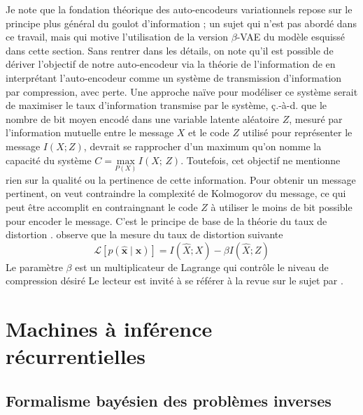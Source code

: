 Je note que la fondation théorique des auto-encodeurs variationnels repose sur le principe plus général 
du goulot d'information \citep{Tishby1999}; un sujet qui n'est pas abordé dans ce travail, mais qui motive 
l'utilisation de la version $\beta$-VAE du modèle esquissé dans cette section. Sans rentrer dans les détails, on note 
qu'il est possible de dériver l'objectif de notre auto-encodeur via la théorie de l'information de \citet{Shannon1948} en interprétant 
l'auto-encodeur comme un système de transmission d'information par compression, avec perte. 
Une approche naïve pour modéliser ce système serait de maximiser le taux d'information transmise par le système, 
ç.-à-d. que le nombre de bit moyen encodé dans une variable latente aléatoire $Z$, mesuré par l'information 
mutuelle entre le message $X$ et le code $Z$ utilisé pour représenter le message $I(X; Z)$, devrait se rapprocher 
d'un maximum qu'on nomme la capacité du système $C = \underset{P(X)}{\mathrm{max}}\, I(X;\,Z)$. 
Toutefois, cet objectif ne mentionne rien sur la qualité ou la pertinence de cette information. Pour obtenir un message pertinent, 
on veut contraindre la complexité de Kolmogorov du message, ce qui peut être accomplit en contraingnant le code $Z$
à utiliser le moins de bit possible pour encoder le message. 
C'est le principe de base de la théorie du taux de distortion \citep{Cover2006}. 
\citet{Tishby1999} observe que la mesure du taux de distortion suivante 
\begin{equation}\label{eq:bottleneck principle}
        \mathcal{L}\left[ p(\hat{\mathbf{x}} \mid \mathbf{x}) \right]  = I(\hat{X}; X) - \beta I(\hat{X};Z)
\end{equation}
Le paramètre $\beta$ est un multiplicateur de Lagrange qui contrôle le niveau de compression désiré
Le lecteur est invité à se référer à la revue sur le sujet par \citet{Goldfield2020}.

\section{Machines à inférence récurrentielles}
\subsection{Formalisme bayésien des problèmes inverses}

